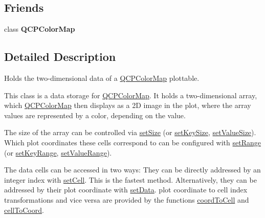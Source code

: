 \subsection*{Friends}
\begin{DoxyCompactItemize}
\item 
class {\bfseries Q\+C\+P\+Color\+Map}\hypertarget{classQCPColorMapData_afa9d9eab63af3e6f20f882c8d7cc9f20}{}\label{classQCPColorMapData_afa9d9eab63af3e6f20f882c8d7cc9f20}

\end{DoxyCompactItemize}


\subsection{Detailed Description}
Holds the two-\/dimensional data of a \hyperlink{classQCPColorMap}{Q\+C\+P\+Color\+Map} plottable. 

This class is a data storage for \hyperlink{classQCPColorMap}{Q\+C\+P\+Color\+Map}. It holds a two-\/dimensional array, which \hyperlink{classQCPColorMap}{Q\+C\+P\+Color\+Map} then displays as a 2D image in the plot, where the array values are represented by a color, depending on the value.

The size of the array can be controlled via \hyperlink{classQCPColorMapData_a0d9ff35c299d0478b682bfbcdd9c097e}{set\+Size} (or \hyperlink{classQCPColorMapData_ac7ef70e383aface34b44dbde49234b6b}{set\+Key\+Size}, \hyperlink{classQCPColorMapData_a0893c9e3914513048b45e3429ffd16f2}{set\+Value\+Size}). Which plot coordinates these cells correspond to can be configured with \hyperlink{classQCPColorMapData_aad9c1c7c703c1339489fc730517c83d4}{set\+Range} (or \hyperlink{classQCPColorMapData_a0738c485f3c9df9ea1241b7a8bb6a86e}{set\+Key\+Range}, \hyperlink{classQCPColorMapData_ada1b2680ba96a5f4175b6d341cf75d23}{set\+Value\+Range}).

The data cells can be accessed in two ways\+: They can be directly addressed by an integer index with \hyperlink{classQCPColorMapData_a8e75eaf8746596319032a93f3d2d0683}{set\+Cell}. This is the fastest method. Alternatively, they can be addressed by their plot coordinate with \hyperlink{classQCPColorMapData_afd2083ccfd6987ec94aa7ef8e91ca39a}{set\+Data}. plot coordinate to cell index transformations and vice versa are provided by the functions \hyperlink{classQCPColorMapData_a26e33c5ec7094b60136350bcd77d3737}{coord\+To\+Cell} and \hyperlink{classQCPColorMapData_ac96d6e84befe7b9951b5da6d4d4a2a47}{cell\+To\+Coord}.

